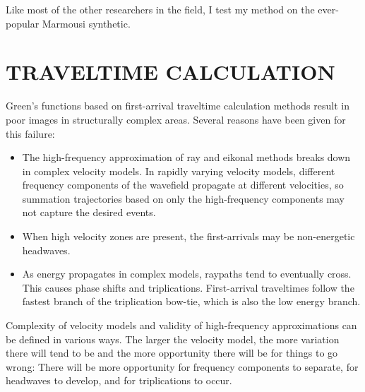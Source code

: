 Like most of the other researchers in the field, I test my method on the
ever-popular Marmousi synthetic.

\section{TRAVELTIME CALCULATION}

Green's functions based on 
first-arrival traveltime calculation methods result in poor images
in structurally complex areas. Several reasons have been given for this
failure:
\begin{itemize}
	\item The high-frequency approximation of ray and eikonal methods breaks
	down in complex velocity models. In rapidly varying velocity models,
	different frequency components of the
	wavefield propagate at different velocities, so summation trajectories
	based on only the high-frequency components may not capture
	the desired events.
	\item When high velocity zones are present, the first-arrivals
	may be non-energetic headwaves.
	\item As energy propagates in complex models, raypaths tend to
	eventually cross. This causes phase shifts and triplications.
	First-arrival traveltimes follow the fastest branch of the
	triplication bow-tie, which is also the low energy branch.
\end{itemize}

Complexity of velocity models and validity of high-frequency approximations
can be defined in various ways. The larger the velocity model, the 
more variation there will tend to be and the more opportunity there will be
for things to go wrong: There will be more opportunity for frequency
components to separate, for headwaves to develop, and for triplications
to occur. 


